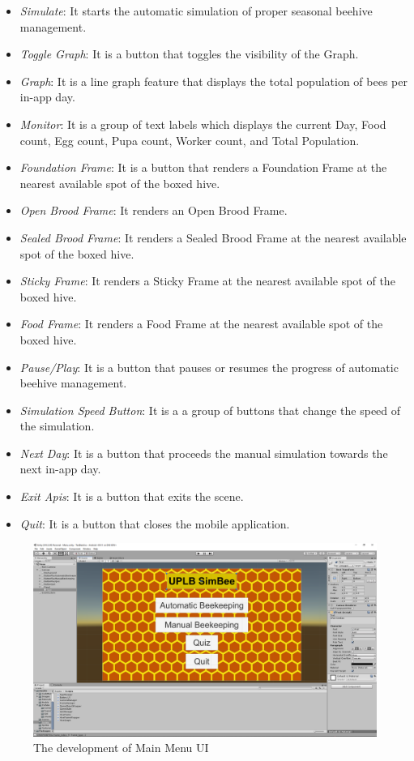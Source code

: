 \documentclass[journal]{./IEEE/IEEEtran}
\begin{document}
\begin{itemize}
    \item \textit{Simulate}: It starts the automatic simulation of proper seasonal beehive management.
    \item \textit{Toggle Graph}: It is a button that toggles the visibility of the Graph.
    \item \textit{Graph}: It is a line graph feature that displays the total population of bees per in-app day.
    \item \textit{Monitor}: It is a group of text labels which displays the current Day, Food count, Egg count, Pupa count, Worker count, and Total Population.
    \item \textit{Foundation Frame}: It is a button that renders a Foundation Frame at the nearest available spot of the boxed hive.
    \item \textit{Open Brood Frame}: It renders an Open Brood Frame.
    \item \textit{Sealed Brood Frame}: It renders a Sealed Brood Frame at the nearest available spot of the boxed hive.
    \item \textit{Sticky Frame}: It renders a Sticky Frame at the nearest available spot of the boxed hive.
    \item \textit{Food Frame}: It renders a Food Frame at the nearest available spot of the boxed hive.
    \item \textit{Pause/Play}: It is a button that pauses or resumes the progress of automatic beehive management.
    \item \textit{Simulation Speed Button}: It is a a group of buttons that change the speed of the simulation.
    \item \textit{Next Day}: It is a button that proceeds the manual simulation towards the next in-app day.
    \item \textit{Exit Apis}: It is a button that exits the scene.
    \item \textit{Quit}: It is a button that closes the mobile application.
\end{itemize}

\begin{figure}[H]
\includegraphics[scale=0.15]{./images/ui-menu.png}
\centering
\caption{The development of Main Menu UI}
\centering
\end{figure}
\end{document}
